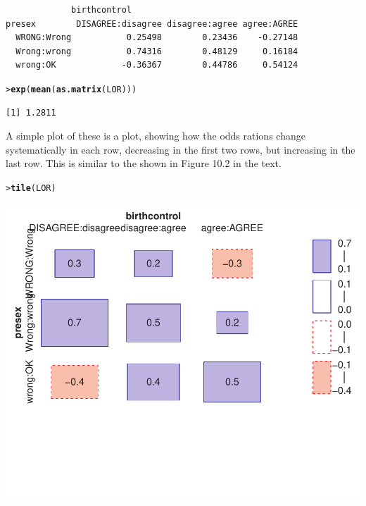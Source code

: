 \documentclass[10pt]{report}\usepackage[]{graphicx}\usepackage[]{color}
\makeatletter
\newcommand{\hlstd}[1]{\textcolor[rgb]{0.345,0.345,0.345}{#1}}%
\newcommand{\hlkwd}[1]{\textcolor[rgb]{0.737,0.353,0.396}{\textbf{#1}}}%
\newenvironment{kframe}{%
 \def\at@end@of@kframe{}%
 \ifinner\ifhmode%
  \def\at@end@of@kframe{\end{minipage}}%
  \begin{minipage}{\columnwidth}%
 \fi\fi%
 \def\FrameCommand##1{\hskip\@totalleftmargin \hskip-\fboxsep
 \colorbox{shadecolor}{##1}\hskip-\fboxsep
     \hskip-\linewidth \hskip-\@totalleftmargin \hskip\columnwidth}%
 \MakeFramed {\advance\hsize-\width
   \@totalleftmargin\z@ \linewidth\hsize
   \@setminipage}}%
 {\par\unskip\endMakeFramed%
 \at@end@of@kframe}
\newenvironment{knitrout}{}{} %
\renewenvironment{knitrout}{\small\renewcommand{\baselinestretch}{.85}}{} %
\makeatother
\begin{document}
\begin{Exercises}
\begin{enumerate*}
\begin{ans}
\begin{knitrout}
\begin{kframe}
\begin{verbatim}
             birthcontrol
presex        DISAGREE:disagree disagree:agree agree:AGREE
  WRONG:Wrong           0.25498        0.23436    -0.27148
  Wrong:wrong           0.74316        0.48129     0.16184
  wrong:OK             -0.36367        0.44786     0.54124
\end{verbatim}
\begin{alltt}
\hlstd{> }\hlkwd{exp}\hlstd{(}\hlkwd{mean}\hlstd{(}\hlkwd{as.matrix}\hlstd{(LOR)))}
\end{alltt}
\begin{verbatim}
[1] 1.2811
\end{verbatim}
\end{kframe}
\end{knitrout}
A simple plot of these is a  plot, showing how the odds rations change
systematically in each row, decreasing in the first two rows, but increasing in the
last row. This is similar to the  shown in Figure 10.2 in the
text.
\begin{knitrout}\footnotesize
{}\color{fgcolor}\begin{kframe}
\begin{alltt}
\hlstd{> }\hlkwd{tile}\hlstd{(LOR)}
\end{alltt}
\end{kframe}

\centerline{\includegraphics[width=.5\textwidth]{soln/fig/ex10_3a2-1} }



\end{knitrout}

    \end{ans}
    

\end{enumerate*}
\end{Exercises}
\end{document}
